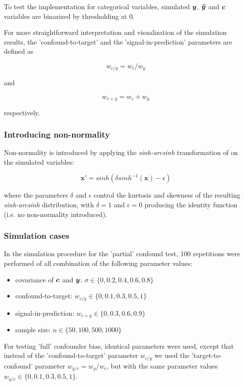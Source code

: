 \documentclass{article}
\begin{document}
To test the implementation for categorical variables, simulated $\boldsymbol{y}$, $\boldsymbol{\hat{y}}$ and $\boldsymbol{c}$ variables are binarized by thresholding at 0.

For more straightforward interpretation and visualization of the simulation results, the 'confound-to-target' and the 'signal-in-prediction' parameters are defined as

$$ w_{c/y} = w_c / w_y $$

and

$$ w_{c+y} = w_c + w_y $$

respectively.

\subsubsection*{Introducing non-normality}

Non-normality is introduced by applying the \emph{sinh-arcsinh} transformation of \cite{jones2009sinh} on the simulated variables:

$$\boldsymbol{x}' = sinh(\delta sinh^{-1}(\boldsymbol{x}) - \epsilon)$$

where the parameters $\delta$ and $\epsilon$ control the kurtosis and skewness of the resulting \emph{sinh-arcsinh} distribution, with $\delta=1$ and $\epsilon=0$ producing the identity function (i.e. no non-normality introduced).

\subsubsection*{Simulation cases}

In the simulation procedure for the 'partial' confound test, 100 repetitions were performed of all combination of the following parameter values: 
\begin{itemize}
    \item covariance of $\boldsymbol{c}$ and $\boldsymbol{y}$: $\sigma \in \{0, 0.2, 0.4, 0.6, 0.8\}$
    \item confound-to-target: $w_{c/y} \in \{0, 0.1, 0.3, 0.5, 1\}$
    \item signal-in-prediction: $w_{c+y} \in \{0, 0.3, 0.6, 0.9\}$
    \item sample size: $n \in \{50, 100, 500, 1000\}$
\end{itemize}

For testing 'full' confounder bias, identical parameters were used, except that instead of the 'confound-to-target' parameter $ w_{c/y}$ we used the 'target-to-confound' parameter $ w_{y/c} = w_y/ w_c $, but with the same parameter values $w_{y/c} \in \{0, 0.1, 0.3, 0.5, 1\}$.
\end{document}
